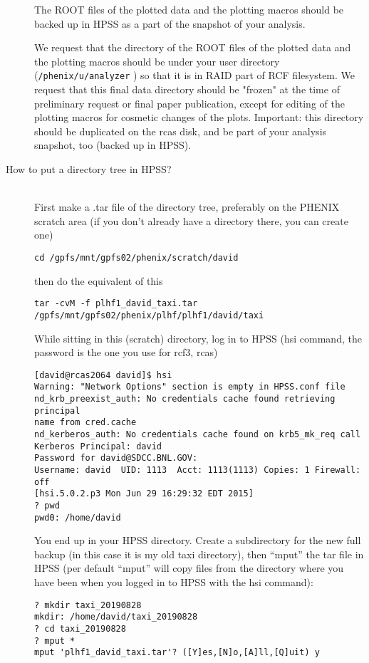 \documentclass[12pt]{article}
\begin{document}
\begin{description}
The ROOT files of the plotted data and the plotting macros should be backed up in HPSS as a part of
the snapshot of your analysis.

We request that the directory of the ROOT files of the plotted data and the plotting macros
should be under your user directory (\verb*|/phenix/u/analyzer| ) so that it is in RAID part
of RCF filesystem. We request that this final data directory should be "frozen"
at the time of preliminary request or final paper publication, except for editing of the plotting macros
for cosmetic changes of the plots.
Important: this directory should be duplicated on the rcas disk, and
be part of your analysis snapshot, too (backed up in HPSS).

\item[How to put a directory tree in HPSS?]~\\
First make a .tar file of the directory tree, 
preferably on the PHENIX scratch area (if you don't already have a
directory there, you can create one) \\
\begin{verbatim}
cd /gpfs/mnt/gpfs02/phenix/scratch/david
\end{verbatim}
then do the equivalent of this
\begin{verbatim}
tar -cvM -f plhf1_david_taxi.tar /gpfs/mnt/gpfs02/phenix/plhf/plhf1/david/taxi
\end{verbatim}
While sitting in this (scratch) directory, log in to HPSS (hsi
command, the password is the one you use for rcf3, rcas)
\begin{verbatim}
[david@rcas2064 david]$ hsi
Warning: "Network Options" section is empty in HPSS.conf file
nd_krb_preexist_auth: No credentials cache found retrieving principal
name from cred.cache
nd_kerberos_auth: No credentials cache found on krb5_mk_req call
Kerberos Principal: david
Password for david@SDCC.BNL.GOV:
Username: david  UID: 1113  Acct: 1113(1113) Copies: 1 Firewall: off 
[hsi.5.0.2.p3 Mon Jun 29 16:29:32 EDT 2015]
? pwd
pwd0: /home/david
\end{verbatim}
You end up in your HPSS directory.  Create a subdirectory 
for the new full backup (in this case it is my old taxi directory), 
then ``mput'' the tar file in HPSS (per default ``mput'' will copy files
from the directory where you have been when you logged in to HPSS with
the hsi command):
\begin{verbatim}
? mkdir taxi_20190828
mkdir: /home/david/taxi_20190828
? cd taxi_20190828
? mput *
mput 'plhf1_david_taxi.tar'? ([Y]es,[N]o,[A]ll,[Q]uit) y

\end{verbatim}
\end{description}
\end{document}
